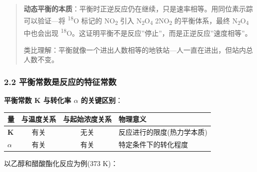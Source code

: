 \begin{quote}
\textbf{动态平衡的本质}：平衡时正逆反应仍在继续，只是速率相等。用同位素示踪可以验证---将 \textsuperscript{18}O 标记的 NO\textsubscript{2} 引入 N\textsubscript{2}O\textsubscript{4} \衡 2NO\textsubscript{2} 的平衡体系，最终 N\textsubscript{2}O\textsubscript{4} 中也会出现 \textsuperscript{18}O。这证明平衡不是反应''停止''，而是正逆反应''速度相等''。

类比理解：平衡就像一个进出人数相等的地铁站---人一直在进出，但站内总人数不变。
\end{quote}

\subsubsection{2.2 平衡常数是反应的特征常数}\label{ux5e73ux8861ux5e38ux6570ux662fux53cdux5e94ux7684ux7279ux5f81ux5e38ux6570}

\textbf{平衡常数 K 与转化率 \(\alpha\) 的关键区别}：

{\def\LTcaptype{none} %
\begin{longtable}[]{@{}lccl@{}}
\toprule\noalign{}
量 & 与温度关系 & 与起始浓度关系 & 物理意义 \\
\midrule\noalign{}
\endhead
\bottomrule\noalign{}
\endlastfoot
\textbf{K} & 有关 & 无关 & 反应进行的限度(热力学本质) \\
\textbf{\(\alpha\)} & 有关 & 有关 & 特定条件下的转化程度 \\
\end{longtable}
}

以乙醇和醋酸酯化反应为例(373 K)：

